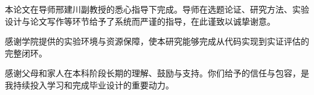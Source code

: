 \thesisacknowledgement
本论文在导师邢建川副教授的悉心指导下完成。导师在选题论证、研究方法、实验设计与论文写作等环节给予了系统而严谨的指导，在此谨致以诚挚谢意。

感谢学院提供的实验环境与资源保障，使本研究能够完成从代码实现到实证评估的完整闭环。

感谢父母和家人在本科阶段长期的理解、鼓励与支持。你们给予的信任与包容，是我持续投入学习和完成毕业设计的重要动力。
